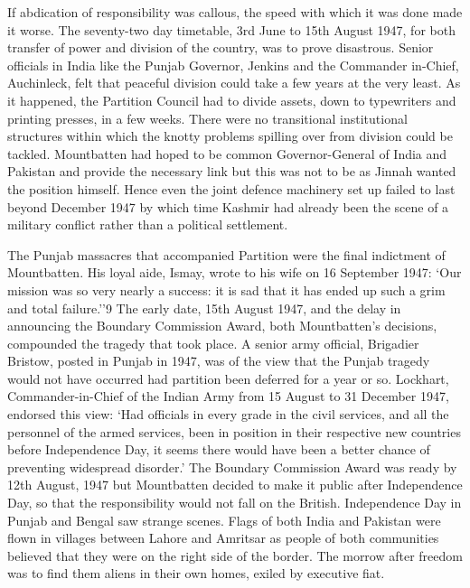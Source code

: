 If abdication of responsibility was callous, the speed with which it was done made it worse. The seventy-two day timetable, 3rd June to 15th August 1947, for both transfer of power and division of the country, was to prove disastrous. Senior officials in India like the Punjab Governor, Jenkins and the Commander­ in-Chief, Auchinleck, felt that peaceful division could take a few years at the very least. As it happened, the Partition Council had to divide assets, down to typewriters and printing presses, in a few weeks. There were no transitional institutional structures within which the knotty problems spilling over from division could be tackled. Mountbatten had hoped to be common Governor-General of India and Pakistan and provide the necessary link but this was not to be as Jinnah wanted the position himself. Hence even the joint defence machinery set up failed to last beyond December 1947 by which time Kashmir had already been the scene of a military conflict rather than a political settlement. 

The Punjab massacres that accompanied Partition were the final indictment of Mountbatten. His loyal aide, Ismay, wrote to his wife on 16 September 1947: `Our mission was so very nearly a success: it is sad that it has ended up such a grim and total failure.''9 The early date, 15th August 1947, and the delay in announcing the Boundary Commission Award, both Mountbatten's decisions, compounded the tragedy that took place. A senior army official, Brigadier Bristow, posted in Punjab in 1947, was of the view that the Punjab tragedy would not have occurred had partition been deferred for a year or so. Lockhart, Commander-in-Chief of the Indian Army from 15 August to 31 December 1947, endorsed this view: `Had officials in every grade in the civil services, and all the personnel of the armed services, been in position in their respective new countries before Independence Day, it seems there would have been a better chance of preventing widespread disorder.' The Boundary Commission Award was ready by 12th August, 1947 but Mountbatten decided to make it public after Independence Day, so that the responsibility would not fall on the British. Independence Day in Punjab and Bengal saw strange scenes. Flags of both India and Pakistan were flown in villages between Lahore and Amritsar as people of both communities believed that they were on the right side of the border. The morrow after freedom was to find them aliens in their own homes, exiled by executive fiat. 

